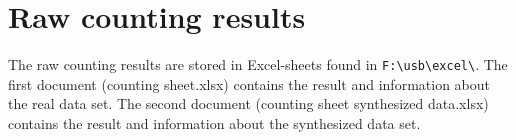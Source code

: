 \section{Raw counting results}
The raw counting results are stored in Excel-sheets found in \verb|F:\usb\excel\|. The first document (counting sheet.xlsx) contains the result and information about the real data set. The second document (counting sheet synthesized data.xlsx) contains the result and information about the synthesized data set.
